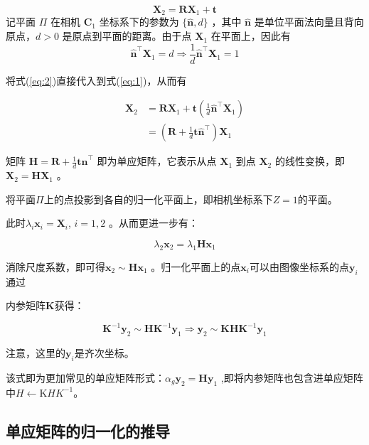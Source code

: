 \documentclass{article}
\begin{document}
\begin{equation} \label{eq:1}  
{\mathbf{X}_2} = {\mathbf{R}}{\mathbf{X}_1} + {\mathbf{t}}
\end{equation}
记平面 ${\Pi}$ 在相机 ${\mathbf{C}_1}$ 坐标系下的参数为 $\{\hat{\mathbf{n}}, d\}$ ，其中 $\hat{\mathbf{n}}$ 是单位平面法向量且背向原点，$d > 0$ 是原点到平面的距离。由于点 ${\mathbf{X}_1}$ 在平面上，因此有
\begin{equation} \label{eq:2}
\hat{\mathbf{n}}^\top{\mathbf{X}_1} = d \Rightarrow \frac{1}{d}\hat{\mathbf{n}}^\top{\mathbf{X}_1} = 1
\end{equation}

将式(\ref{eq:2})直接代入到式(\ref{eq:1})，从而有

$$\begin{aligned}
{\mathbf{X}_2} &= {\mathbf{R}}{\mathbf{X}_1} + {\mathbf{t}}\left(\frac{1}{d}\hat{\mathbf{n}}^\top{\mathbf{X}_1}\right) \\
&= \left({\mathbf{R}} + \frac{1}{d}{\mathbf{t}}\hat{\mathbf{n}}^\top\right){\mathbf{X}_1}
\end{aligned}
$$

矩阵 ${\mathbf{H}} = {\mathbf{R}} + \frac{1}{d}{\mathbf{t}}\hat{\mathbf{n}}^\top$ 即为单应矩阵，它表示从点 ${\mathbf{X}_1}$ 到点 ${\mathbf{X}_2}$ 的线性变换，即 ${\mathbf{X}_2} = {\mathbf{H}}{\mathbf{X}_1}$ 。

将平面$\Pi$上的点投影到各自的归一化平面上，即相机坐标系下$Z=1$的平面。

此时$\lambda _i\mathbf{x} _i= \mathbf{X} _i$, $i= 1, 2$ 。从而更进一步有：

$$\lambda_2\mathbf{x}_2=\lambda_1\mathbf{H}\mathbf{x}_1$$



消除尺度系数，即可得$\mathbf{x}_2\sim\mathbf{H}\mathbf{x}_1$ 。归一化平面上的点$\mathbf{x}_i$可以由图像坐标系的点$\mathbf{y}_i$通过

内参矩阵$\mathbf{K}$获得：

$$\mathbf{K}^{-1}\mathbf{y}_2\sim\mathbf{H}\mathbf{K}^{-1}\mathbf{y}_1\Rightarrow\mathbf{y}_2\sim\mathbf{K}\mathbf{H}\mathbf{K}^{-1}\mathbf{y}_1$$



注意，这里的$\mathbf{y}_i$是齐次坐标。

该式即为更加常见的单应矩阵形式：$\alpha_g\mathbf{y}_2=\mathbf{Hy}_1$ ,即将内参矩阵也包含进单应矩阵中$H\leftarrow \mathrm KHK^{- 1}$。

\subsection{单应矩阵的归一化的推导}
\end{document}
